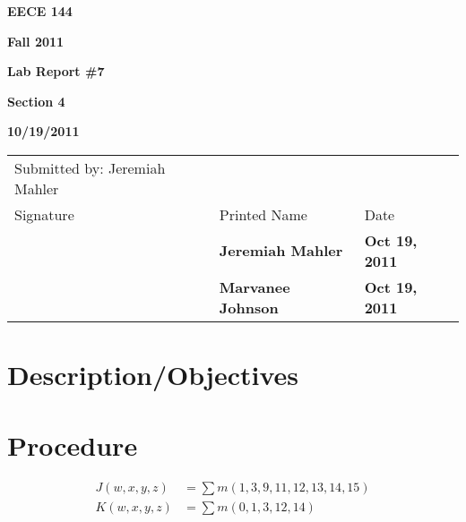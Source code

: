 \documentclass[12pt]{article}
\begin{document}

\centerline{\bf EECE 144}
\centerline{\bf Fall 2011}
\centerline{\bf}
\centerline{\bf Lab Report \#7}
\centerline{\bf Section 4}
\centerline{\bf 10/19/2011}

\begin{center}
\begin{tabularx}{\textwidth}[b]{X l l}
Submitted by: Jeremiah Mahler & & \\
Signature & Printed Name & Date \\
\hline
\multicolumn{1}{|X|}{} & \multicolumn{1}{|l|}{\bigstrut \bf Jeremiah Mahler} & \multicolumn{1}{|l|}{\bf Oct 19, 2011} \\
\hline
\multicolumn{1}{|X|}{} & \multicolumn{1}{|l|}{\bigstrut \bf Marvanee Johnson} & \multicolumn{1}{|l|}{\bf Oct 19, 2011} \\
\hline
\end{tabularx}
\end{center}

\section{Description/Objectives}

\section{Procedure}
\label{sec:procedure}

\begin{align}
J(w, x, y, z) &= \sum m(1,3,9,11,12,13,14,15) \label{eq:Jcsop} \\
K(w, x, y, z) &= \sum m(0,1,3,12,14) \label{eq:Kcsop}
\end{align}
\end{document}
